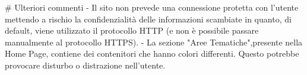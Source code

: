 # Ulteriori commenti
 - Il sito non prevede una connessione protetta con l'utente mettendo a rischio la confidenzialità delle informazioni scambiate in quanto, di default, viene utilizzato il protocollo HTTP (e non è possibile passare manualmente al protocollo HTTPS). 
 - La sezione "Aree Tematiche",presente nella Home Page, contiene dei contenitori che hanno colori differenti. Questo potrebbe provocare disturbo o distrazione nell'utente.
